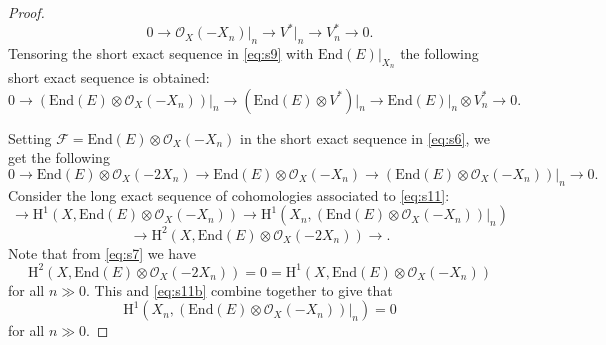 \documentclass[10pt,a4paper]{amsart}
\begin{document}
\begin{proof}
\begin{equation}
\label{eq:s9}
0  \longrightarrow  \mathcal{O}_X(-X_n)\big\vert_n  \longrightarrow  V^*\big\vert_n
\longrightarrow  V^*_n  \longrightarrow   0. 
\end{equation}
Tensoring the short exact sequence in \eqref{eq:s9} with $\mathrm{End} (E)\big\vert_{X_n}$ the following
short exact sequence is obtained:
\begin{equation}
\label{eq:s10}
0 \longrightarrow  \left( \mathrm{End} (E) \otimes \mathcal{O}_X(-X_n) \right)\big\vert_n
 \longrightarrow  \left( \mathrm{End} (E) \otimes V^* \right)\big\vert_n  \longrightarrow  
\mathrm{End} (E)\big\vert_n \otimes V^*_n  \longrightarrow  0.
\end{equation}

Setting $\mathcal{F}  =  \mathrm{End} (E) \otimes \mathcal{O}_X(-X_n) $ in the short exact sequence in
\eqref{eq:s6}, we get the following
\begin{equation}\label{eq:s11}
0  \longrightarrow  \mathrm{End} (E)\otimes \mathcal{O}_X(-2 X_n)   \longrightarrow  \mathrm{End} (E)\otimes
\mathcal{O}_X(-X_n)   \longrightarrow  \left( \mathrm{End} (E) \otimes \mathcal{O}_X(-X_n) \right)\big\vert_n
\longrightarrow  0.
\end{equation}
Consider the long exact sequence of cohomologies associated to \eqref{eq:s11}:
\begin{equation*}
\longrightarrow  \mathrm{H}^1\left(X,  \mathrm{End} (E)\otimes \mathcal{O}_X(- X_n) \right)   \longrightarrow 
\mathrm{H}^1\left(X_n,  \left( \mathrm{End} (E) \otimes \mathcal{O}_X(-X_n) \right)\big\vert_n \right)
 \end{equation*}
\begin{equation}\label{eq:s11b}
\longrightarrow \mathrm{H}^2\left(X,  \mathrm{End} (E)\otimes \mathcal{O}_X(-2 X_n) \right) 
\longrightarrow.
\end{equation}
Note that from \eqref{eq:s7} we have 
\begin{equation}
\label{eq:s12}
\mathrm{H}^2\left(X,  \mathrm{End} (E)\otimes \mathcal{O}_X(-2 X_n) \right)  =  0  =  
\mathrm{H}^1\left(X,  \mathrm{End} (E)\otimes \mathcal{O}_X(- X_n) \right)
\end{equation}
for all $n  \gg  0$. This and \eqref{eq:s11b} combine together to give that
\begin{equation}
\label{eq:s13}
\mathrm{H}^1\left(X_n,  \left( \mathrm{End} (E) \otimes \mathcal{O}_X(-X_n) \right)\big\vert_n \right)  =  0
\end{equation}
for all $n  \gg   0$.


\end{proof}
\end{document}
